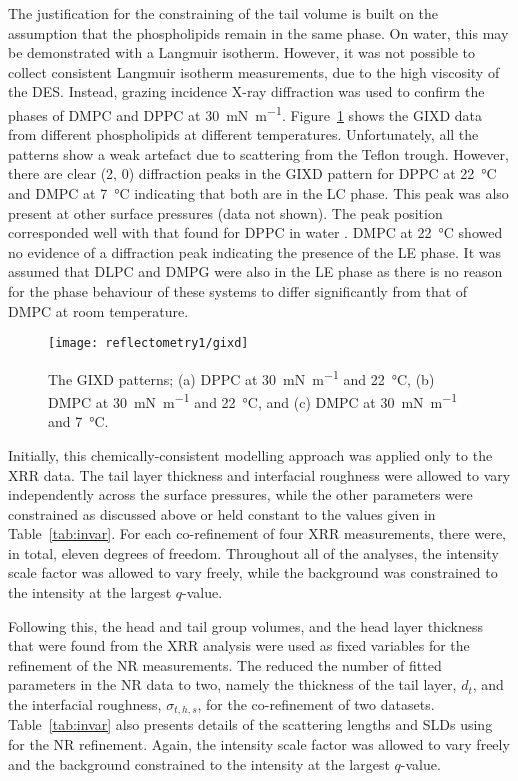 The justification for the constraining of the tail volume is built on the assumption that the phospholipids remain in the same phase.
On water, this may be demonstrated with a Langmuir isotherm.
However, it was not possible to collect consistent Langmuir isotherm measurements, due to the high viscosity of the DES.
Instead, grazing incidence X-ray diffraction was used to confirm the phases of DMPC and DPPC at \SI{30}{\milli\newton\per\meter}.
Figure~\ref{fig:gixd} shows the GIXD data from different phospholipids at different temperatures.
Unfortunately, all the patterns show a weak artefact due to scattering from the Teflon trough.
However, there are clear (2, 0) diffraction peaks in the GIXD pattern for DPPC at \SI{22}{\celsius} and DMPC at \SI{7}{\celsius} indicating that both are in the LC phase.
This peak was also present at other surface pressures (data not shown).
The peak position corresponded well with that found for DPPC in water \cite{watkins_structure_2009}.
DMPC at \SI{22}{\celsius} showed no evidence of a diffraction peak indicating the presence of the LE phase.
It was assumed that DLPC and DMPG were also in the LE phase as there is no reason for the phase behaviour of these systems to differ significantly from that of DMPC at room temperature.
%
\begin{figure}
    \centering
    \texttt{[image: reflectometry1/gixd]}
    \caption{The GIXD patterns; (a) DPPC at \SI{30}{\milli\newton\per\meter} and \SI{22}{\celsius}, (b) DMPC at \SI{30}{\milli\newton\per\meter} and \SI{22}{\celsius}, and (c) DMPC at \SI{30}{\milli\newton\per\meter} and \SI{7}{\celsius}.}
    \label{fig:gixd}
\end{figure}
%

Initially, this chemically-consistent modelling approach was applied only to the XRR data.
The tail layer thickness and interfacial roughness were allowed to vary independently across the surface pressures, while the other parameters were constrained as discussed above or held constant to the values given in Table~\ref{tab:invar}.
For each co-refinement of four XRR measurements, there were, in total, eleven degrees of freedom.
Throughout all of the analyses, the intensity scale factor was allowed to vary freely, while the background was constrained to the intensity at the largest $q$-value.

Following this, the head and tail group volumes, and the head layer thickness that were found from the XRR analysis were used as fixed variables for the refinement of the NR measurements.
The reduced the number of fitted parameters in the NR data to two, namely the thickness of the tail layer, $d_t$, and the interfacial roughness, $\sigma_{t,h,s}$, for the co-refinement of two datasets.
Table~\ref{tab:invar} also presents details of the scattering lengths and SLDs using for the NR refinement.
Again, the intensity scale factor was allowed to vary freely and the background constrained to the intensity at the largest $q$-value.

